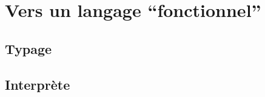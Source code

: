 \section{Vers un langage ``fonctionnel''}

\subsection{Typage}

\begin{frame}
  \frametitle{}
  \begin{block}{}
  \end{block}
\end{frame}

\subsection{Interprète}

\begin{frame}
  \frametitle{}
  \begin{block}{}
  \end{block}
\end{frame}
